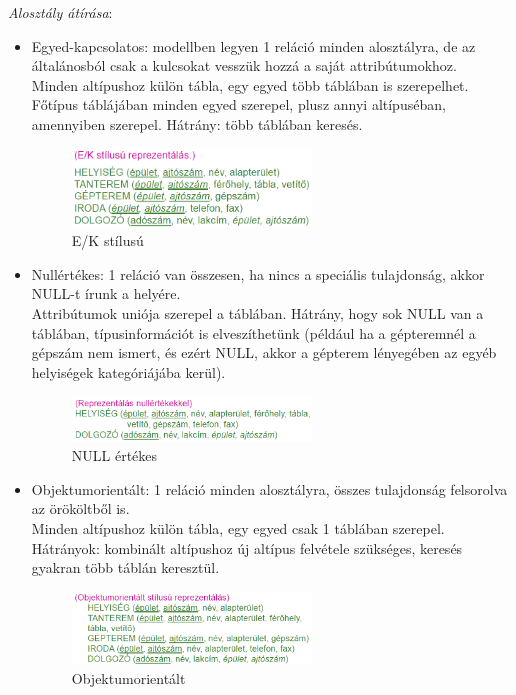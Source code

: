 \documentclass[margin=0px]{article}
\begin{document}
	\textit{Alosztály átírása}:
	\begin{itemize}
		\item Egyed-kapcsolatos: modellben legyen 1 reláció minden alosztályra, de az általánosból csak a kulcsokat vesszük hozzá a saját attribútumokhoz.\\
		Minden altípushoz külön tábla, egy egyed több táblában is szerepelhet. Főtípus táblájában minden egyed szerepel, plusz annyi altípuséban, amennyiben szerepel. Hátrány: több táblában keresés.
		\begin{figure}[H]
			\centering
			\includegraphics[width=0.6\textwidth]{img/ek.png}
			\caption{E/K stílusú}
		\end{figure}
		\item Nullértékes: 1 reláció van összesen, ha nincs a speciális tulajdonság, akkor NULL-t írunk a helyére.\\
		Attribútumok uniója szerepel a táblában. Hátrány, hogy sok NULL van a táblában, típusinformációt is elveszíthetünk (például ha a gépteremnél a gépszám nem ismert, és ezért NULL, akkor a gépterem lényegében az egyéb helyiségek kategóriájába kerül). 
		\begin{figure}[H]
			\centering
			\includegraphics[width=0.6\textwidth]{img/null.png}
			\caption{NULL értékes}
		\end{figure}
		\item Objektumorientált: 1 reláció minden alosztályra, összes tulajdonság felsorolva az örököltből is. \\
		Minden altípushoz külön tábla, egy egyed csak 1 táblában szerepel. Hátrányok: kombinált altípushoz új altípus felvétele szükséges, keresés gyakran több táblán keresztül.
		\begin{figure}[H]
			\centering
			\includegraphics[width=0.6\textwidth]{img/oo.png}
			\caption{Objektumorientált}
		\end{figure}
	\end{itemize}
	
\end{document}
